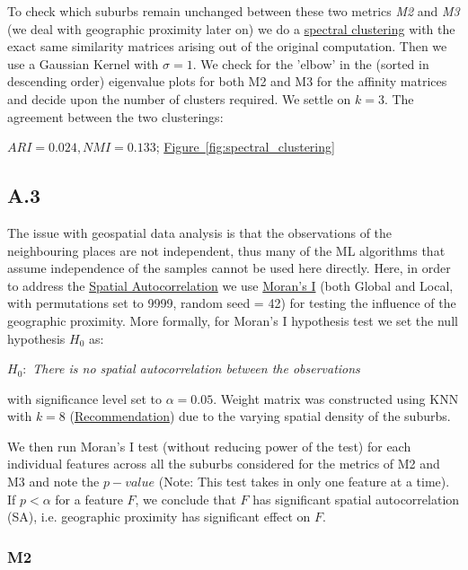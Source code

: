 \documentclass[
	a4paper, %
	10pt, %
	unnumberedsections, %
	twoside, %
]{LTJournalArticle}
\begin{document}
To check which suburbs remain unchanged between these two metrics \textit{M2} and \textit{M3} (we deal with geographic proximity later on) we do a \href{https://en.wikipedia.org/wiki/Spectral_clustering}{spectral clustering} with the exact same similarity matrices arising out of the original computation. Then we use a Gaussian Kernel with $\sigma=1$. We check for the 'elbow' in the (sorted in descending order) eigenvalue plots for both M2 and M3 for the affinity matrices and decide upon the number of clusters required. We settle on $k=3$. The agreement between the two clusterings:

$ARI=0.024, NMI=0.133$;  \hyperref[sub@fig:spectral_clustering]{Figure~\ref{fig:spectral_clustering}}


\subsection{A.3}


The issue with geospatial data analysis is that the observations of the neighbouring places are not independent, thus many of the ML algorithms that assume independence of the samples cannot be used here directly. Here, in order to address the \href{https://www.sciencedirect.com/topics/mathematics/spatial-autocorrelation}{Spatial Autocorrelation} we use \href{https://en.wikipedia.org/wiki/Moran%27s_I}{Moran's I} (both Global and Local, with permutations set to 9999, random seed = 42) for testing the influence of the geographic proximity. More formally, for Moran's I hypothesis test we set the null hypothesis $H_0$ as:

$H_0:$ \textit{There is no spatial autocorrelation between the observations}

with significance level set to $\alpha =0.05$. Weight matrix was constructed using KNN with $k=8$ (\href{https://pro.arcgis.com/en/pro-app/latest/tool-reference/spatial-statistics/spatial-autocorrelation.htm}{Recommendation}) due to the varying spatial density of the suburbs.

We then run Moran's I test (without reducing power of the test) for each individual features across all the suburbs considered for the metrics of M2 and M3 and note the $p-value$ (Note: This test takes in only one feature at a time). If $p<\alpha$ for a feature $F$, we conclude that $F$ has significant spatial autocorrelation (SA), i.e. geographic proximity has significant effect on $F$.

\subsubsection{M2}\leavevmode
\end{document}
